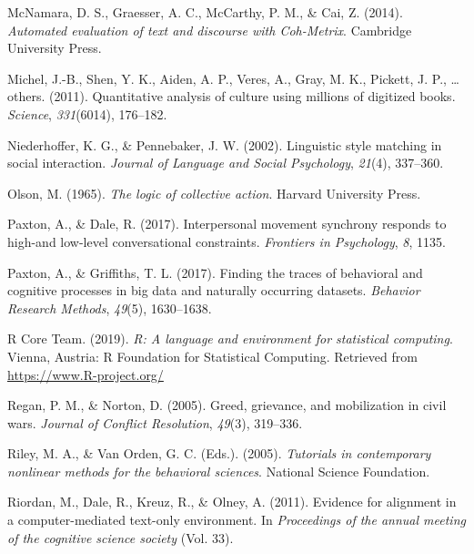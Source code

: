 \documentclass[
  english,
  man]{apa6}
\begin{document}
\leavevmode\hypertarget{ref-mcnamara2014automated}{}%
McNamara, D. S., Graesser, A. C., McCarthy, P. M., \& Cai, Z. (2014). \emph{Automated evaluation of text and discourse with Coh-Metrix}. Cambridge University Press.

\leavevmode\hypertarget{ref-michel2011quantitative}{}%
Michel, J.-B., Shen, Y. K., Aiden, A. P., Veres, A., Gray, M. K., Pickett, J. P., \ldots{} others. (2011). Quantitative analysis of culture using millions of digitized books. \emph{Science}, \emph{331}(6014), 176--182.

\leavevmode\hypertarget{ref-niederhoffer2002linguistic}{}%
Niederhoffer, K. G., \& Pennebaker, J. W. (2002). Linguistic style matching in social interaction. \emph{Journal of Language and Social Psychology}, \emph{21}(4), 337--360.

\leavevmode\hypertarget{ref-olson1965logic}{}%
Olson, M. (1965). \emph{The logic of collective action}. Harvard University Press.

\leavevmode\hypertarget{ref-paxton2017interpersonal}{}%
Paxton, A., \& Dale, R. (2017). Interpersonal movement synchrony responds to high-and low-level conversational constraints. \emph{Frontiers in Psychology}, \emph{8}, 1135.

\leavevmode\hypertarget{ref-paxton2017finding}{}%
Paxton, A., \& Griffiths, T. L. (2017). Finding the traces of behavioral and cognitive processes in big data and naturally occurring datasets. \emph{Behavior Research Methods}, \emph{49}(5), 1630--1638.

\leavevmode\hypertarget{ref-R-base}{}%
R Core Team. (2019). \emph{R: A language and environment for statistical computing}. Vienna, Austria: R Foundation for Statistical Computing. Retrieved from \url{https://www.R-project.org/}

\leavevmode\hypertarget{ref-regan2005greed}{}%
Regan, P. M., \& Norton, D. (2005). Greed, grievance, and mobilization in civil wars. \emph{Journal of Conflict Resolution}, \emph{49}(3), 319--336.

\leavevmode\hypertarget{ref-riley2005tutorials}{}%
Riley, M. A., \& Van Orden, G. C. (Eds.). (2005). \emph{Tutorials in contemporary nonlinear methods for the behavioral sciences}. National Science Foundation.

\leavevmode\hypertarget{ref-riordan2011evidence}{}%
Riordan, M., Dale, R., Kreuz, R., \& Olney, A. (2011). Evidence for alignment in a computer-mediated text-only environment. In \emph{Proceedings of the annual meeting of the cognitive science society} (Vol. 33).
\end{document}
